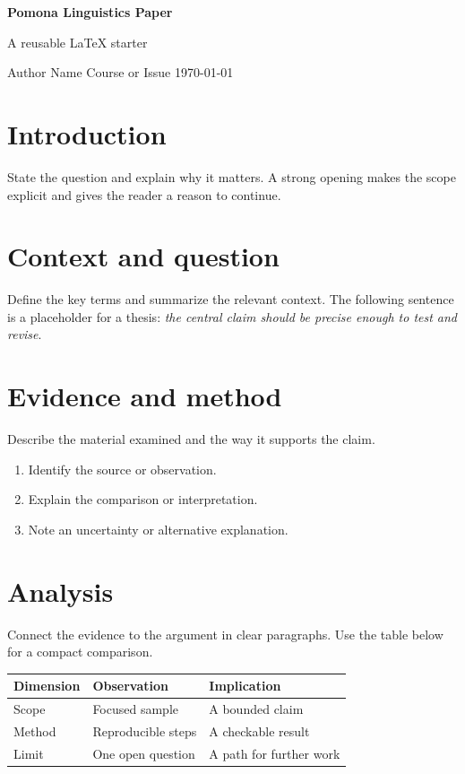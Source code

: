 \documentclass[11pt]{article}
\begin{document}
\begin{center}
  {\LARGE\bfseries\textcolor{accent}{Pomona Linguistics Paper}}\par\medskip
  {\large A reusable LaTeX starter}\par
  {\small Author Name \quad\textbar\quad Course or Issue \quad\textbar\quad \today}
\end{center}
\vspace{1em}
\begin{abstract}
This starter demonstrates a structured argument about pomona linguistics paper. Replace this abstract with a concise account of the question, approach, evidence, and conclusion.
\end{abstract}
\section{Introduction}
State the question and explain why it matters. A strong opening makes the scope explicit and gives the reader a reason to continue.
\section{Context and question}
Define the key terms and summarize the relevant context. The following sentence is a placeholder for a thesis: \emph{the central claim should be precise enough to test and revise}.
\section{Evidence and method}
Describe the material examined and the way it supports the claim.
\begin{enumerate}[label=\arabic*.]
  \item Identify the source or observation.
  \item Explain the comparison or interpretation.
  \item Note an uncertainty or alternative explanation.
\end{enumerate}
\section{Analysis}
Connect the evidence to the argument in clear paragraphs. Use the table below for a compact comparison.
\begin{center}\begin{tabular}{@{}lll@{}}\toprule
Dimension & Observation & Implication\\ \midrule
Scope & Focused sample & A bounded claim\\
Method & Reproducible steps & A checkable result\\
Limit & One open question & A path for further work\\
\bottomrule\end{tabular}\end{center}
\end{document}
